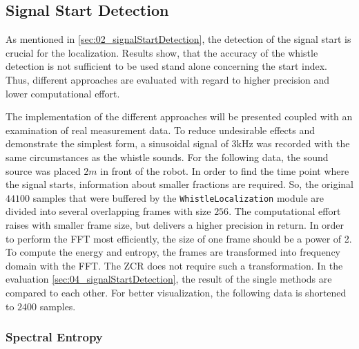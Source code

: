 \subsection{Signal Start Detection}
\label{subsec:03_signalStartDetection}

As mentioned in \cref{sec:02_signalStartDetection}, the detection of the
signal start is crucial for the localization.
Results show, that the accuracy of the whistle detection is not
sufficient to be used stand alone concerning the start index.
Thus, different approaches are evaluated with regard to higher
precision and lower computational effort.

The implementation of the different approaches will be presented coupled with
an examination of real measurement data.
To reduce undesirable effects and demonstrate the simplest form, a sinusoidal
signal of $3\si{\kilo\hertz}$ was recorded with the same circumstances as the
whistle sounds.
For the following data, the sound source was placed $2\si{m}$ in front of the robot.
In order to find the time point where the signal starts, information about
smaller fractions are required.
So, the original $44100$ samples that were buffered by the
\lstinline!WhistleLocalization! module are divided into several overlapping
frames with size $256$. The computational effort raises with smaller frame size,
but delivers a higher precision in return.
In order to perform the \ac{FFT} most efficiently, the size of one frame
should be a power of 2.
To compute the energy and entropy, the frames are transformed into
frequency domain with the \ac{FFT}.
The \ac{ZCR} does not require such a transformation.
In the evaluation \cref{sec:04_signalStartDetection}, the result of the single
methods are compared to each other.
For better visualization, the following data is shortened to $2400$ samples.


\subsubsection*{Spectral Entropy}

